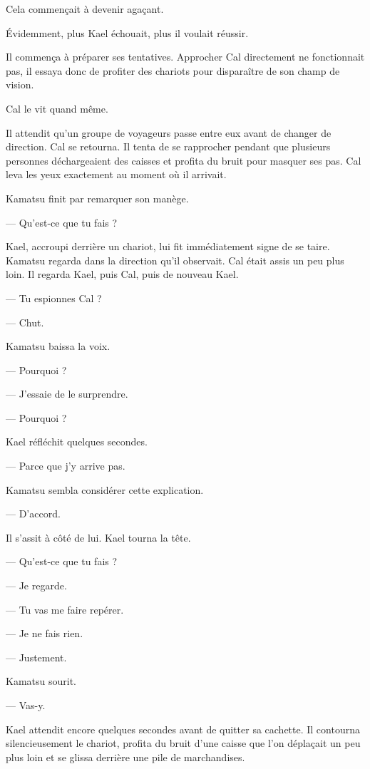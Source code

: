 Cela commençait à devenir agaçant.

Évidemment, plus Kael échouait, plus il voulait réussir.

\scenebreak

Il commença à préparer ses tentatives. Approcher Cal directement ne
fonctionnait pas, il essaya donc de profiter des chariots pour disparaître de
son champ de vision.

Cal le vit quand même.

Il attendit qu'un groupe de voyageurs passe entre eux avant de changer de
direction. Cal se retourna. Il tenta de se rapprocher pendant que plusieurs
personnes déchargeaient des caisses et profita du bruit pour masquer ses pas.
Cal leva les yeux exactement au moment où il arrivait.

Kamatsu finit par remarquer son manège.

— Qu'est-ce que tu fais ?

Kael, accroupi derrière un chariot, lui fit immédiatement signe de se taire.
Kamatsu regarda dans la direction qu'il observait. Cal était assis un peu plus
loin. Il regarda Kael, puis Cal, puis de nouveau Kael.

— Tu espionnes Cal ?

— Chut.

Kamatsu baissa la voix.

— Pourquoi ?

— J'essaie de le surprendre.

— Pourquoi ?

Kael réfléchit quelques secondes.

— Parce que j'y arrive pas.

Kamatsu sembla considérer cette explication.

— D'accord.

Il s'assit à côté de lui. Kael tourna la tête.

— Qu'est-ce que tu fais ?

— Je regarde.

— Tu vas me faire repérer.

— Je ne fais rien.

— Justement.

Kamatsu sourit.

— Vas-y.

Kael attendit encore quelques secondes avant de quitter sa cachette. Il
contourna silencieusement le chariot, profita du bruit d'une caisse que l'on
déplaçait un peu plus loin et se glissa derrière une pile de marchandises.

